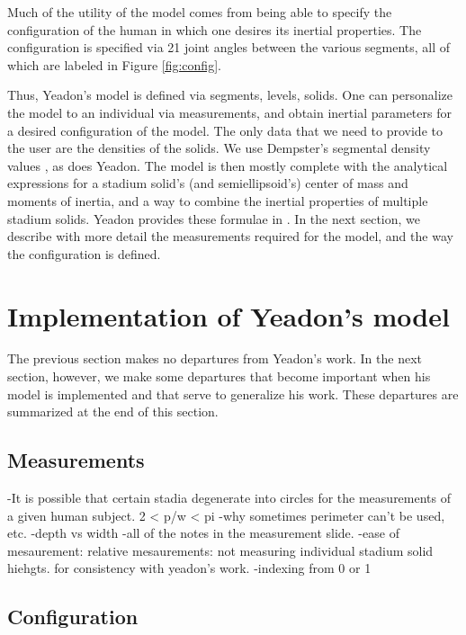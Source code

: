 \documentclass[10pt]{article}
\begin{document}
Much of the utility of the model comes from being able to specify the
configuration of the human in which one desires its inertial properties. The
configuration is specified via 21 joint angles between the various segments,
all of which are labeled in Figure \ref{fig:config}.

Thus, Yeadon's model is defined via segments, levels, solids. One can
personalize the model to an individual via measurements, and obtain inertial
parameters for a desired configuration of the model. The only data that we need
to provide to the user are the densities of the solids. We use Dempster's
segmental density values \cite{Dempster1955}, as does Yeadon. The model is then
mostly complete with the analytical expressions for a stadium solid's (and semiellipsoid's) center of
mass and moments of inertia, and a way to combine the inertial properties of
multiple stadium solids. Yeadon provides these formulae in \cite{Yeadon1990f}.
In the next section, we describe with more detail the measurements required for
the model, and the way the configuration is defined.

\section*{Implementation of Yeadon's model}


The previous section makes no departures from Yeadon's work. In the next
section, however, we make some departures that become important when his model
is implemented and that serve to generalize his work. These departures are
summarized at the end of this section.

\subsection*{Measurements}

-It is possible that certain stadia degenerate into circles for the measurements
of a given human subject. 2 < p/w < pi
-why sometimes perimeter can't be used, etc.
-depth vs width
-all of the notes in the measurement slide.
-ease of mesaurement: relative mesaurements: not measuring individual stadium solid hiehgts. for consistency with yeadon's work.
-indexing from 0 or 1

\subsection*{Configuration}
\end{document}
